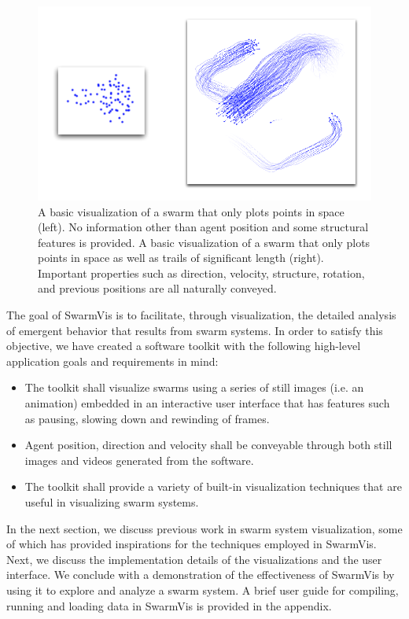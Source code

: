 \documentclass[conference]{IEEEtran}
\begin{document}
\begin{figure}
\centering
\includegraphics[scale=.55]{images/intro.pdf}
\caption{A basic visualization of a swarm that only plots points in space (left).
No information other than agent position and some structural features is provided.
A basic visualization of a swarm that only plots points in space as well as trails of significant length (right).
Important properties such as direction, velocity, structure, rotation,
and previous positions are all naturally conveyed.
}
\label{Intro}
\end{figure}

The goal of SwarmVis is to facilitate, through visualization, the detailed analysis of emergent behavior that results from swarm systems.
In order to satisfy this objective, we have created a software toolkit
with the following high-level application goals and requirements in mind:
\begin{itemize}
\item The toolkit shall visualize swarms using a series of still images (i.e. an animation)
embedded in an interactive user interface that has features such as pausing, slowing down and rewinding of frames.
\item Agent position, direction and velocity shall be conveyable through both still images and videos generated from the software.
\item The toolkit shall provide a variety of built-in visualization techniques that are useful in visualizing swarm systems.
\end{itemize}

In the next section, we discuss previous work in swarm system visualization,
some of which has provided inspirations for the techniques employed in SwarmVis.
Next, we discuss the implementation details of the visualizations and the user interface.
We conclude with a demonstration of the effectiveness of SwarmVis by using it to explore and analyze a swarm system.
A brief user guide for compiling, running and loading data in SwarmVis is provided in the appendix.
\end{document}
